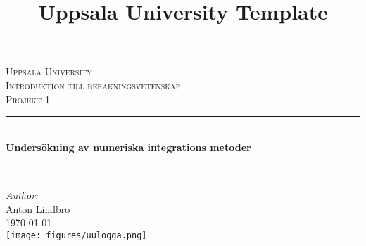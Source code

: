 \documentclass[12pt]{article}
\title{Uppsala University Template}
\begin{document}
\begin{titlepage}

\newcommand{\HRule}{\rule{\linewidth}{0.5mm}} %

\begin{center}
\textsc{\LARGE Uppsala University}\\[1.5cm] %
\textsc{\Large Introduktion till beräkningsvetenskap}\\[0.5cm] %
\textsc{\large Projekt 1}\\[0.5cm] %

\HRule \\[0.4cm]
{ \huge \bfseries Undersökning av numeriska integrations metoder}\\[0.4cm] %
\HRule \\[1.5cm]
 

\large\emph{Author:}\\ Anton Lindbro\\[1.0cm]%




{\large \today}\\[1cm] %

\texttt{[image: figures/uulogga.png]}\\%
\end{center}
\end{titlepage}
\end{document}
